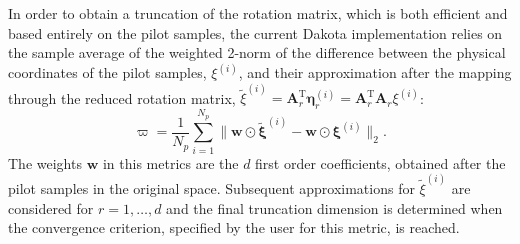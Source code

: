 In order to obtain a truncation of the rotation matrix, which is both efficient and based entirely on the pilot samples, the current Dakota implementation relies on the sample average of the weighted 2-norm of the difference between the physical coordinates of the pilot samples, $\xi^{(i)}$, and their approximation after the mapping through the reduced rotation matrix, $\tilde{\xi}^{(i)} = \bm{A}_r^{\mathrm{T}} \bm{\eta}_r^{(i)} = \bm{A}_r^{\mathrm{T}} \bm{A}_r \xi^{(i)}$:
\begin{equation}
\varpi = \frac{1}{N_p} \sum_{i=1}^{N_p} \parallel \bm{w} \odot \tilde{\bm{\xi}}^{(i)} - \bm{w} \odot {\bm{\xi}}^{(i)} \parallel_2.
\end{equation}
The weights $\bm{w}$ in this metrics are the $d$ first order coefficients, obtained after the pilot samples in the original space. Subsequent approximations for $\tilde{\xi}^{(i)}$ are considered for $r=1,\dots,d$ and the final truncation dimension is determined when the convergence criterion, specified by the user for this metric, is reached.  

